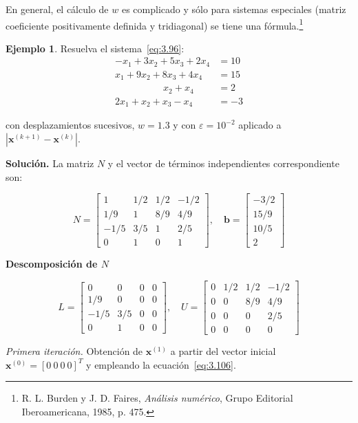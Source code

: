\documentclass[12pt,letterpaper]{article}
\theoremstyle{definition}
\newtheorem{ejemplo}{Ejemplo}[section]
\theoremstyle{plain}
\theoremstyle{remark}
\begin{document}
En general, el cálculo de $w$ es complicado y sólo para sistemas especiales (matriz coeficiente positivamente definida y tridiagonal) se tiene una fórmula.\footnote{R. L. Burden y J. D. Faires, \textit{Análisis numérico}, Grupo Editorial Iberoamericana, 1985, p. 475.}

\begin{ejemplo}
Resuelva el sistema~\eqref{eq:3.96}:
\[
\begin{aligned}
- x_1 + 3x_2 + 5x_3 + 2x_4 &= 10 \\
x_1 + 9x_2 + 8x_3 + 4x_4 &= 15 \\
\quad\quad\quad\quad\quad x_2 + x_4 &= 2 \\
2x_1 + x_2 + x_3 - x_4 &= -3
\end{aligned}
\]

con desplazamientos sucesivos, $w = 1.3$ y con $\varepsilon = 10^{-2}$ aplicado a $|\mathbf{x}^{(k+1)} - \mathbf{x}^{(k)}|$.
\end{ejemplo}
\textbf{Solución.} La matriz $N$ y el vector de términos independientes correspondiente son:

\[
N =
\begin{bmatrix}
1 & 1/2 & 1/2 & -1/2 \\
1/9 & 1 & 8/9 & 4/9 \\
-1/5 & 3/5 & 1 & 2/5 \\
0 & 1 & 0 & 1
\end{bmatrix},
\quad
\mathbf{b} =
\begin{bmatrix}
-3/2 \\
15/9 \\
10/5 \\
2
\end{bmatrix}
\]

\textbf{Descomposición de $N$}

\[
L =
\begin{bmatrix}
0 & 0 & 0 & 0 \\
1/9 & 0 & 0 & 0 \\
-1/5 & 3/5 & 0 & 0 \\
0 & 1 & 0 & 0
\end{bmatrix},
\quad
U =
\begin{bmatrix}
0 & 1/2 & 1/2 & -1/2 \\
0 & 0 & 8/9 & 4/9 \\
0 & 0 & 0 & 2/5 \\
0 & 0 & 0 & 0
\end{bmatrix}
\]

\textit{Primera iteración.} Obtención de $\mathbf{x}^{(1)}$ a partir del vector inicial $\mathbf{x}^{(0)} = [0\ 0\ 0\ 0]^T$ y empleando la ecuación~\eqref{eq:3.106}.
\end{document}
